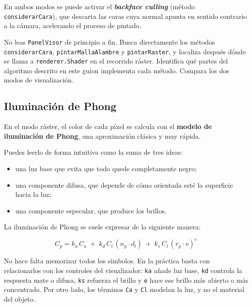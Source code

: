 \documentclass[
  spanish,
  11pt,
  a4paper,
  DIV=11,
  numbers=noendperiod]{scrartcl}
\providecommand{\tightlist}{%
  \setlength{\itemsep}{0pt}\setlength{\parskip}{0pt}}
\begin{document}
En ambos modos se puede activar el \textbf{\emph{backface culling}} (método \texttt{considerarCara}), que descarta las caras cuya normal apunta en sentido contrario a la cámara, acelerando el proceso de pintado.

\begin{tcolorbox}[enhanced jigsaw, colframe=quarto-callout-note-color-frame, arc=.35mm, bottomrule=.15mm, left=2mm, breakable, opacityback=0, coltitle=black, bottomtitle=1mm, toptitle=1mm, titlerule=0mm, toprule=.15mm, rightrule=.15mm, title={Busca en el código}, colbacktitle=quarto-callout-note-color!10!white, opacitybacktitle=0.6, colback=white, leftrule=.75mm]

No leas \texttt{PanelVisor} de principio a fin. Busca directamente los métodos \texttt{considerarCara}, \texttt{pintarMallaAlambre} y \texttt{pintarRaster}, y localiza después dónde se llama a \texttt{renderer.Shader} en el recorrido ráster. Identifica qué partes del algoritmo descrito en este guion implementa cada método. Compara los dos modos de visualización.

\end{tcolorbox}

\subsection{Iluminación de Phong}

\label{iluminación-de-phong}

En el modo ráster, el color de cada píxel se calcula con el \textbf{modelo de iluminación de Phong}, una aproximación clásica y muy rápida.

Puedes leerlo de forma intuitiva como la suma de tres ideas:

\begin{itemize}
\tightlist
\item
  una luz base que evita que todo quede completamente negro;
\item
  una componente difusa, que depende de cómo orientada esté la superficie hacia la luz;
\item
  una componente especular, que produce los brillos.
\end{itemize}

La iluminación de Phong se suele expresar de la siguiente manera:

\[
C_p = k_a\, C_a \;+\; k_d\, C_l\,(n_p \cdot d_l) \;+\; k_s\, C_l\,(r_p \cdot v)^{e}
\]

No hace falta memorizar todos los símbolos. En la práctica basta con relacionarlos con los controles del visualizador: \texttt{ka} añade luz base, \texttt{kd} controla la respuesta mate o difusa, \texttt{ks} refuerza el brillo y \texttt{e} hace ese brillo más abierto o más concentrado. Por otro lado, los términos \texttt{Ca} y \texttt{Cl} modelan la luz, y no el material del objeto.
\end{document}
